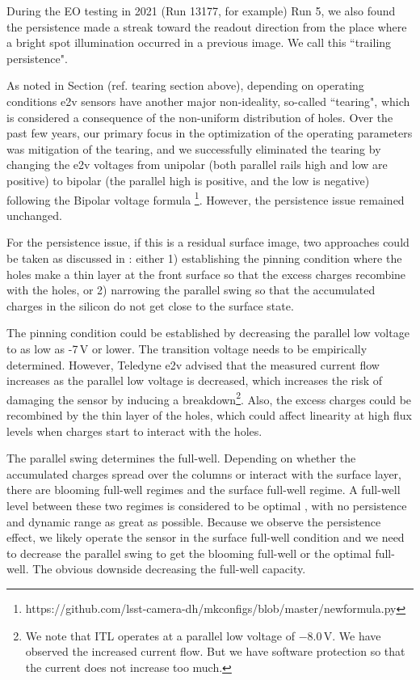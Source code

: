 During the EO testing in 2021 (Run 13177, for example) Run 5, we also found the persistence made a
streak toward the readout direction from the place where a bright spot illumination occurred 
in a previous image. We call this ``trailing persistence".

As noted in Section (ref. tearing section above), depending on operating conditions e2v sensors have another major non-ideality, so-called ``tearing", which is
considered a consequence of the non-uniform distribution of holes. Over the past few years, our
primary focus in the optimization of the operating parameters was mitigation of the tearing, and we successfully eliminated the tearing by changing the
e2v voltages from unipolar (both parallel rails high and low
are positive) to bipolar (the parallel high is positive, and
the low is negative) following the Bipolar voltage formula
\footnote{https://github.com/lsst-camera-dh/mkconfigs/blob/master/newformula.py}.
However, the persistence issue
remained unchanged.

For the persistence issue, if this is a residual surface image, two
approaches could be taken as discussed in \citep{2024SPIE13103E..0WU}:  
either 1) establishing the pinning condition where the holes make a thin
layer at the front surface so that the excess charges recombine with
the holes, or 2) narrowing the parallel swing so that the accumulated
charges in the silicon do not get close to the surface state.

The pinning condition could be established by decreasing the parallel low
voltage to as low as -7\,V or lower. The transition voltage needs to be
empirically determined. However, Teledyne e2v advised that the measured
current flow increases as the parallel low voltage is decreased, which
increases the risk of damaging the sensor by inducing a
breakdown\footnote{We note that ITL operates at a parallel low voltage
  of $-$8.0\,V. We have observed the increased current flow. But we have
  software protection so that the current does not increase too much.}.
Also, the excess charges could be recombined by the thin layer of
the holes, which could affect linearity at high flux levels when
charges start to interact with the holes.

The parallel swing determines the full-well. Depending on whether the
accumulated charges spread over the columns or interact with the surface
layer, there are blooming full-well regimes and the surface full-well
regime. A full-well level between these two regimes is considered to be
optimal \citep{2001sccd.book.....J}, with no persistence and dynamic range as great as
possible. Because we observe the persistence effect, we likely operate the sensor in the
surface full-well condition and we need to decrease the parallel swing to
get the blooming full-well or the optimal full-well. The obvious downside
decreasing the full-well capacity.


